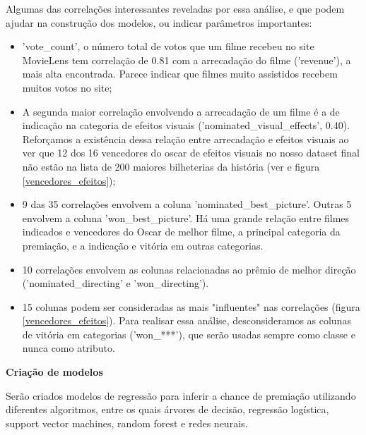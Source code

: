             Algumas das correlações interessantes reveladas por essa análise, e que podem ajudar na construção dos modelos, ou indicar parâmetros importantes:
            
            \begin{itemize}

            \item 'vote\_count', o número total de votos que um filme recebeu no site MovieLens tem correlação de 0.81 com a arrecadação do filme ('revenue'), a mais alta encontrada. Parece indicar que filmes muito assistidos recebem muitos votos no site;

            \item A segunda maior correlação envolvendo a arrecadação de um filme é a de indicação na categoria de efeitos visuais ('nominated\_visual\_effects', 0.40). Reforçamos a existência dessa relação entre arrecadação e efeitos visuais ao ver que 12 dos 16 vencedores do oscar de efeitos visuais no nosso dataset final não estão na lista de 200 maiores bilheterias da história (ver  e figura \ref{vencedores_efeitos});
            
            \item 9 das 35 correlações envolvem a coluna 'nominated\_best\_picture'. Outras 5 envolvem a coluna 'won\_best\_picture'. Há uma grande relação entre filmes indicados e vencedores do Oscar de melhor filme, a principal categoria da premiação, e a indicação e vitória em outras categorias.
            
            \item 10 correlações envolvem as colunas relacionadas ao prêmio de melhor direção ('nominated\_directing' e 'won\_directing').
            
            \item 15 colunas podem ser consideradas as mais "influentes" nas correlações (figura \ref{vencedores_efeitos}). Para realisar essa análise, desconsideramos as colunas de vitória em categorias ('won\_***'), que serão usadas sempre como classe e nunca como atributo.

            \end{itemize}
            
            \textbf{Criação de modelos}\par
            Serão criados modelos de regressão para inferir a chance de premiação utilizando diferentes algoritmos, entre os quais árvores de decisão, regressão logística, support vector machines, random forest e redes neurais.\newline
    
